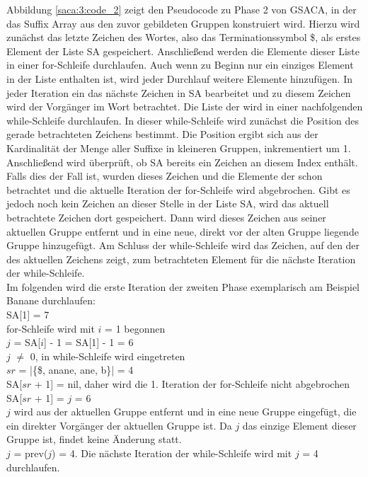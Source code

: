 Abbildung \ref{saca:3:code_2} zeigt den Pseudocode zu Phase 2 von GSACA, in der das Suffix Array aus den zuvor gebildeten Gruppen konstruiert wird.
Hierzu wird zunächst das letzte Zeichen des Wortes, also das Terminationssymbol \$, als erstes Element der Liste SA gespeichert. 
Anschließend werden die Elemente dieser Liste in einer for-Schleife durchlaufen.
Auch wenn zu Beginn nur ein einziges Element in der Liste enthalten ist, wird jeder Durchlauf weitere Elemente hinzufügen.
In jeder Iteration ein das nächste Zeichen in SA bearbeitet und zu diesem Zeichen wird der Vorgänger im Wort betrachtet. 
Die Liste der \prevpointer wird in einer nachfolgenden while-Schleife durchlaufen.
In dieser while-Schleife wird zunächst die Position des gerade betrachteten Zeichens bestimmt. 
Die Position ergibt sich aus der Kardinalität der Menge aller Suffixe in kleineren Gruppen, inkrementiert um 1. 
Anschließend wird überprüft, ob SA bereits ein Zeichen an diesem Index enthält. 
Falls dies der Fall ist, wurden dieses Zeichen und die Elemente der \prevpointer schon betrachtet und die aktuelle Iteration der for-Schleife wird abgebrochen. 
Gibt es jedoch noch kein Zeichen an dieser Stelle in der Liste SA, wird das aktuell betrachtete Zeichen dort gespeichert. 
Dann wird dieses Zeichen aus seiner aktuellen Gruppe entfernt und in eine neue, direkt vor der alten Gruppe liegende Gruppe hinzugefügt.
Am Schluss der while-Schleife wird das Zeichen, auf den der \prevpointer des aktuellen Zeichens zeigt, zum betrachteten Element für die nächste Iteration der while-Schleife.\\

Im folgenden wird die erste Iteration der zweiten Phase exemplarisch am Beispiel Banane durchlaufen:\\
SA[1] = 7\\
for-Schleife wird mit $i$ = 1 begonnen\\
$j$ = SA[$i$] - 1 = SA[1] - 1 = 6\\
$j$ $\neq$ 0, in while-Schleife wird eingetreten\\
$sr$ = |\{\$, anane, ane, b\}| = 4\\
SA[$sr$ + 1] = nil, daher wird die 1. Iteration der for-Schleife nicht abgebrochen\\
SA[$sr$ + 1] = $j$ = 6\\
$j$ wird aus der aktuellen Gruppe entfernt und in eine neue Gruppe eingefügt, die ein direkter Vorgänger der aktuellen Gruppe ist. Da $j$ das einzige Element dieser Gruppe ist, findet keine Änderung statt.\\
$j$ = prev($j$) = 4. Die nächste Iteration der while-Schleife wird mit $j$ = 4 durchlaufen.


\clearpage %
